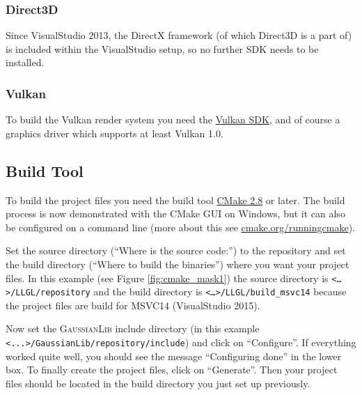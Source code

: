 \documentclass{article}
\begin{document}
\subsubsection{Direct3D}

Since VisualStudio 2013, the DirectX framework (of which Direct3D is a part of) is included within
the VisualStudio setup, so no further SDK needs to be installed.

\subsubsection{Vulkan}

To build the Vulkan render system you need the \href{https://lunarg.com/vulkan-sdk/}{Vulkan SDK},
and of course a graphics driver which supports at least Vulkan 1.0.

\newpage
\subsection{Build Tool}

To build the \LLGL project files you need the build tool \href{https://cmake.org/}{CMake 2.8} or later.
The build process is now demonstrated with the CMake GUI on Windows, but it can also be configured
on a command line (more about this see \href{https://cmake.org/runningcmake/}{cmake.org/runningcmake}).

Set the source directory (``Where is the source code:'') to the \LLGL repository
and set the build directory (``Where to build the binaries'') where you want your project files.
In this example (see Figure \ref{fig:cmake_mask1}) the source directory is \texttt{<\dots>/LLGL/repository}
and the build directory is \texttt{<\dots>/LLGL/build\_msvc14} because the project files are build
for MSVC14 (VisualStudio 2015).

Now set the \textsc{GaussianLib} include directory (in this example \texttt{<...>/GaussianLib/repository/include})
and click on ``Configure''. If everything worked quite well, you should see the message ``Configuring done''
in the lower box. To finally create the project files, click on ``Generate''.
Then your project files should be located in the build directory you just set up previously.
\end{document}

